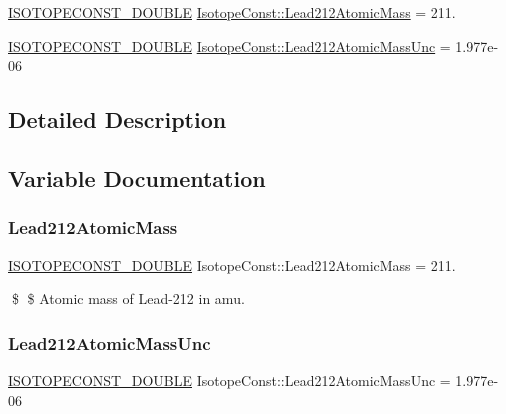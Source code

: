 \begin{DoxyCompactItemize}
\item 
\mbox{\hyperlink{group___isotope_const-_macros_ga8f45a7272ce02c0b4c65c44636ed719a}{I\+S\+O\+T\+O\+P\+E\+C\+O\+N\+S\+T\+\_\+\+D\+O\+U\+B\+LE}} \mbox{\hyperlink{group___isotope_const-_lead-_pb212_ga087ee40bd89c325468c6bda38a90e2c3}{Isotope\+Const\+::\+Lead212\+Atomic\+Mass}} = 211.
\item 
\mbox{\hyperlink{group___isotope_const-_macros_ga8f45a7272ce02c0b4c65c44636ed719a}{I\+S\+O\+T\+O\+P\+E\+C\+O\+N\+S\+T\+\_\+\+D\+O\+U\+B\+LE}} \mbox{\hyperlink{group___isotope_const-_lead-_pb212_gad1ef090913bac5b6dfb661b025031046}{Isotope\+Const\+::\+Lead212\+Atomic\+Mass\+Unc}} = 1.\+977e-\/06
\end{DoxyCompactItemize}


\subsection{Detailed Description}


\subsection{Variable Documentation}
\mbox{\label{group___isotope_const-_lead-_pb212_ga087ee40bd89c325468c6bda38a90e2c3}} 
\subsubsection{\texorpdfstring{Lead212\+Atomic\+Mass}{Lead212AtomicMass}}
{\footnotesize\ttfamily \mbox{\hyperlink{group___isotope_const-_macros_ga8f45a7272ce02c0b4c65c44636ed719a}{I\+S\+O\+T\+O\+P\+E\+C\+O\+N\+S\+T\+\_\+\+D\+O\+U\+B\+LE}} Isotope\+Const\+::\+Lead212\+Atomic\+Mass = 211.}

\$ \$ Atomic mass of Lead-\/212 in amu. \mbox{\label{group___isotope_const-_lead-_pb212_gad1ef090913bac5b6dfb661b025031046}} 
\subsubsection{\texorpdfstring{Lead212\+Atomic\+Mass\+Unc}{Lead212AtomicMassUnc}}
{\footnotesize\ttfamily \mbox{\hyperlink{group___isotope_const-_macros_ga8f45a7272ce02c0b4c65c44636ed719a}{I\+S\+O\+T\+O\+P\+E\+C\+O\+N\+S\+T\+\_\+\+D\+O\+U\+B\+LE}} Isotope\+Const\+::\+Lead212\+Atomic\+Mass\+Unc = 1.\+977e-\/06}

